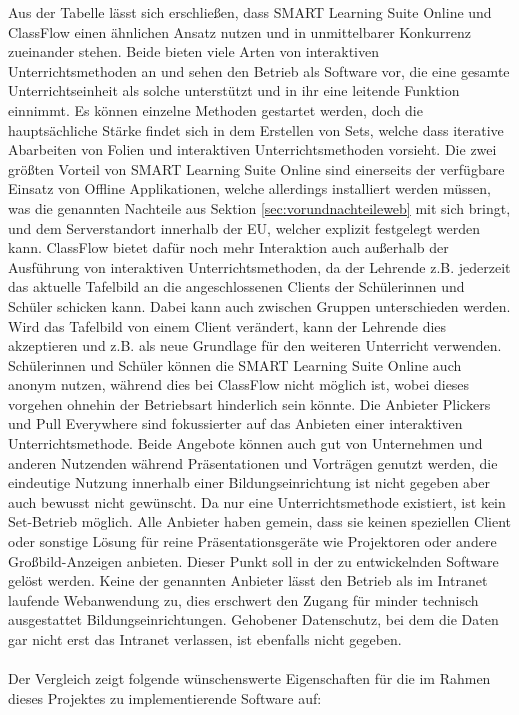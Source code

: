 Aus der Tabelle lässt sich erschließen, dass SMART Learning Suite Online und ClassFlow einen ähnlichen Ansatz nutzen und in unmittelbarer Konkurrenz 
zueinander stehen. Beide bieten viele Arten von interaktiven Unterrichtsmethoden an und sehen den Betrieb als Software vor, die eine gesamte Unterrichtseinheit als solche unterstützt und in ihr eine leitende Funktion einnimmt. Es können einzelne Methoden gestartet werden, doch die hauptsächliche Stärke findet sich in dem Erstellen von Sets, welche dass iterative Abarbeiten von Folien und interaktiven Unterrichtsmethoden vorsieht. Die zwei größten Vorteil von SMART Learning Suite Online sind einerseits der verfügbare Einsatz von Offline Applikationen, welche allerdings installiert werden müssen, was die genannten Nachteile aus Sektion \ref{sec:vorundnachteileweb} mit sich bringt, und dem Serverstandort innerhalb der EU, welcher explizit festgelegt werden kann. ClassFlow bietet dafür noch mehr Interaktion auch außerhalb der Ausführung von interaktiven Unterrichtsmethoden, da der Lehrende z.B. jederzeit das aktuelle Tafelbild an die angeschlossenen Clients der Schülerinnen und Schüler schicken kann. Dabei kann auch zwischen Gruppen unterschieden werden. Wird das Tafelbild von einem Client verändert, kann der Lehrende dies akzeptieren und z.B. als neue Grundlage für den weiteren Unterricht verwenden. Schülerinnen und Schüler können die SMART Learning Suite Online auch anonym nutzen, während dies bei ClassFlow nicht möglich ist, wobei dieses vorgehen ohnehin der Betriebsart hinderlich sein könnte. Die Anbieter Plickers und Pull Everywhere sind fokussierter auf das Anbieten einer interaktiven Unterrichtsmethode. Beide Angebote können auch gut von Unternehmen und anderen Nutzenden während Präsentationen und Vorträgen genutzt werden, die eindeutige Nutzung innerhalb einer Bildungseinrichtung ist nicht gegeben aber auch bewusst nicht gewünscht. Da nur eine Unterrichtsmethode existiert, ist kein Set-Betrieb möglich. Alle Anbieter haben gemein, dass sie keinen speziellen Client oder sonstige Lösung für reine Präsentationsgeräte wie Projektoren oder andere Großbild-Anzeigen anbieten. Dieser Punkt soll in der zu entwickelnden Software gelöst werden. Keine der genannten Anbieter lässt den Betrieb als im Intranet laufende Webanwendung zu, dies erschwert den Zugang für minder technisch ausgestattet Bildungseinrichtungen. Gehobener Datenschutz, bei dem die Daten gar nicht erst das Intranet verlassen, ist ebenfalls nicht gegeben. \\ \\
Der Vergleich zeigt folgende wünschenswerte Eigenschaften für die im Rahmen dieses Projektes zu implementierende Software auf:
